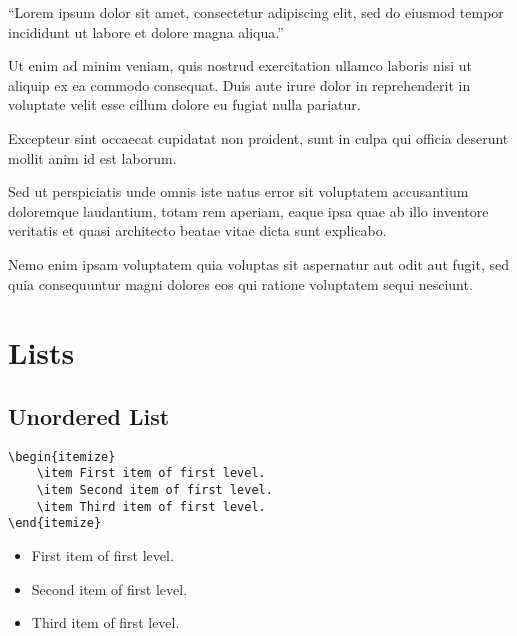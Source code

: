 ``Lorem ipsum dolor sit amet, consectetur adipiscing elit,
sed do eiusmod tempor incididunt ut labore et dolore magna aliqua.''

\begin{flushleft}
Ut enim ad minim veniam, quis nostrud exercitation ullamco laboris nisi ut
aliquip ex ea commodo consequat. Duis aute irure dolor in reprehenderit in
voluptate velit esse cillum dolore eu fugiat nulla pariatur.
\end{flushleft}

\begin{center}
Excepteur sint occaecat cupidatat non proident, sunt in culpa qui officia
deserunt mollit anim id est laborum.
\end{center}

\begin{flushright}
Sed ut perspiciatis unde omnis iste natus error sit voluptatem accusantium
doloremque laudantium, totam rem aperiam, eaque ipsa quae ab illo inventore
veritatis et quasi architecto beatae vitae dicta sunt explicabo.
\end{flushright}

Nemo enim ipsam voluptatem quia voluptas sit aspernatur aut odit aut fugit,
sed quia consequuntur magni dolores eos qui ratione voluptatem sequi nesciunt.

\section*{Lists}

\subsection*{Unordered List}

\begin{lstlisting}[caption={An unordered list.}]
\begin{itemize}
    \item First item of first level.
    \item Second item of first level.
    \item Third item of first level.
\end{itemize}
\end{lstlisting}

\begin{itemize}
    \item First item of first level.
    \item Second item of first level.
    \item Third item of first level.
\end{itemize}

